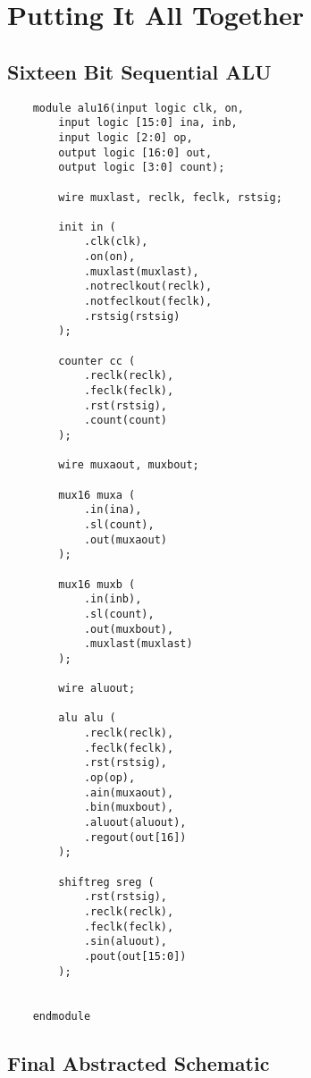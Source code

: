 \documentclass[../main] {subfiles}
\begin{document}
\section{Putting It All Together}

\subsection {Sixteen Bit Sequential ALU}

\begin{verbatim}
    module alu16(input logic clk, on,
        input logic [15:0] ina, inb,
        input logic [2:0] op,
        output logic [16:0] out,
        output logic [3:0] count);

        wire muxlast, reclk, feclk, rstsig;

        init in (
            .clk(clk),
            .on(on),
            .muxlast(muxlast),
            .notreclkout(reclk),
            .notfeclkout(feclk),
            .rstsig(rstsig)
        );

        counter cc (
            .reclk(reclk),
            .feclk(feclk),
            .rst(rstsig),
            .count(count)
        );

        wire muxaout, muxbout;

        mux16 muxa (
            .in(ina),
            .sl(count),
            .out(muxaout)
        );

        mux16 muxb (
            .in(inb),
            .sl(count),
            .out(muxbout),
            .muxlast(muxlast)
        );

        wire aluout;

        alu alu (
            .reclk(reclk),
            .feclk(feclk),
            .rst(rstsig),
            .op(op),
            .ain(muxaout),
            .bin(muxbout),
            .aluout(aluout),
            .regout(out[16])
        );

        shiftreg sreg (
            .rst(rstsig),
            .reclk(reclk),
            .feclk(feclk),
            .sin(aluout),
            .pout(out[15:0])
        );


    endmodule
\end{verbatim}

\subsection{Final Abstracted Schematic}
\end{document}
